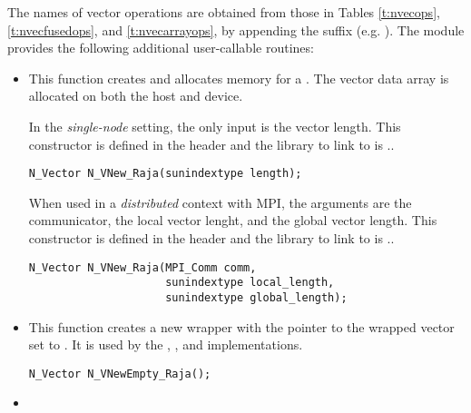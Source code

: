 The names of vector operations are obtained from those in Tables \ref{t:nvecops},
\ref{t:nvecfusedops}, and \ref{t:nvecarrayops}, by appending the suffix 
(e.g. ).
The module {\nvecraja}  provides the following additional user-callable routines:
\begin{itemize}



\item {}

  This function creates and allocates memory for a {\cuda} .
  The vector data array is allocated on both the host and device.

  In the \textit{single-node} setting, the only input is the vector length. This
  constructor is defined in the header  and the library to
  link to is ..

\begin{verbatim}
N_Vector N_VNew_Raja(sunindextype length);
\end{verbatim}

  When used in a \textit{distributed} context with MPI, the arguments are the
  {\mpi} communicator, the local vector lenght, and the global vector length.
  This constructor is defined in the header  and
  the library to link to is ..

\begin{verbatim}
N_Vector N_VNew_Raja(MPI_Comm comm,
                     sunindextype local_length,
                     sunindextype global_length);
\end{verbatim}


\item {}

  This function creates a new {\nvector} wrapper with the pointer to
  the wrapped {\raja} vector set to . It is used by the
  , , and 
  implementations.

\begin{verbatim}
N_Vector N_VNewEmpty_Raja();
\end{verbatim}



\item {}


\end{itemize}
